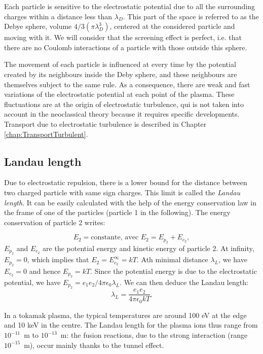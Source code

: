 Each particle is sensitive to the electrostatic potential due to all the surrounding charges within a distance less than $\lambda_D$. This part of the space is referred to as the Debye sphere, volume $4/3(\pi\lambda_D^3)$, centered at the considered particle and moving with it. We will consider that the screening effect is perfect, i.e. that there are no Coulomb interactions of a particle with those outside this sphere.

The movement of each particle is influenced at every time by the potential created by its neighbours inside the Deby sphere, and these neighbours are themselves subject to the same rule. As a consequence, there are weak and fast variations of the electrostatic potential at each point of the plasma. These fluctuations are at the origin of electrostatic turbulence, qui is not taken into account in the neoclassical theory because it requires specific developments. Transport due to electrostatic turbulence is described in Chapter \ref{chap:TransportTurbulent}.


				\subsection{Landau length}
				\label{DistanceDeLandau}


Due to electrostatic repulsion, there is a lower bound for the distance between two charged particle with same sign charges. This limit is called the \textit{Landau length}. It can be easily calculated with the help of the energy conservation law in the frame of one of the particles (particle 1 in the following). The energy conservation of particle 2 writes:

\[
			E_2 = \mbox{constante, avec } E_2 = E_{p_2} + E_{c_2},
\]
$E_{p_2}$ and $E_{c_2}$ are the potential energy and kinetic energy of particle 2. At infinity, $E_{p_2} = 0$, which implies that $E_2 = E_{c_2}^\infty = kT$. Ath minimal distance $\lambda_L$, we have $E_{c_2} = 0$ and hence $E_{p_2} = kT$. Since the potential energy is due to the electrostatic potential, we have $E_{p_2} = e_1 e_2 / 4\pi\epsilon_0\lambda_L$. We can then deduce the Landau length:
\begin{equation}
		\lambda_L = \frac{e_1 e_2}{4\pi\epsilon_0 kT}.
		\label{Landau}
\end{equation}

In a tokamak plasma, the typical temperatures are around 100 eV at the edge and 10 keV in the centre. The Landau length for the plasma ions thus range from $10^{-11}$~m to $10^{-13}$~m: the fusion reactions, due to the strong interaction (range $10^{-15}$~m), occur mainly thanks to the tunnel effect.


